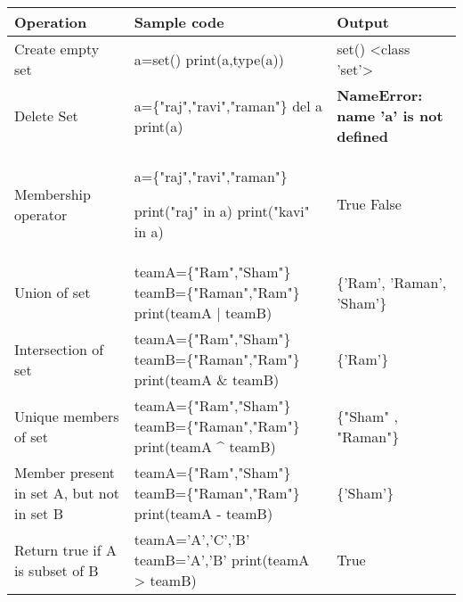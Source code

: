 

\begin{flushleft}

	
	\begin{tabulary}{1.0\textwidth}{|p{7em}|p{12em}|p{7em}|}

		\toprule

		\textbf{Operation} & \textbf{Sample code}  & \textbf{Output} \\

		\midrule

		Create empty set & a=set() \newline print(a,type(a)) & set() <class 'set'> \\

		\hline

		Delete Set & a=\{"raj","ravi","raman"\} \newline del a \newline print(a) & \textbf{NameError: name 'a' is not defined} \\

		\hline

		Membership operator & a=\{"raj","ravi","raman"\} \newline 

		print("raj" in a) \newline print("kavi" in a) & True \newline False \\

		\hline
		Union of set & teamA=\{"Ram","Sham"\} \newline teamB=\{"Raman","Ram"\} \newline
		print(teamA | teamB)
		 & \{'Ram', 'Raman', 'Sham'\} \\

		 \hline
		 Intersection of set & teamA=\{"Ram","Sham"\} \newline teamB=\{"Raman","Ram"\} \newline print(teamA \& teamB) & \{'Ram'\} \\

 		 \hline
 		 Unique members of set & teamA=\{"Ram","Sham"\} \newline teamB=\{"Raman","Ram"\} \newline print(teamA \textbf{\^}  teamB) & \{"Sham" , "Raman"\} \\

 		 \hline
		 Member present in set A, but not in set B & teamA=\{"Ram","Sham"\} \newline teamB=\{"Raman","Ram"\} \newline print(teamA - teamB) & \{'Sham'\} \\

  		 \hline
		  Return true if A is subset of B & teamA={'A','C','B'} \newline teamB={'A','B'} \newline print(teamA > teamB) & True 
		  \\ 
		\bottomrule

	\end{tabulary}

	
	
\end{flushleft}

\newpage

